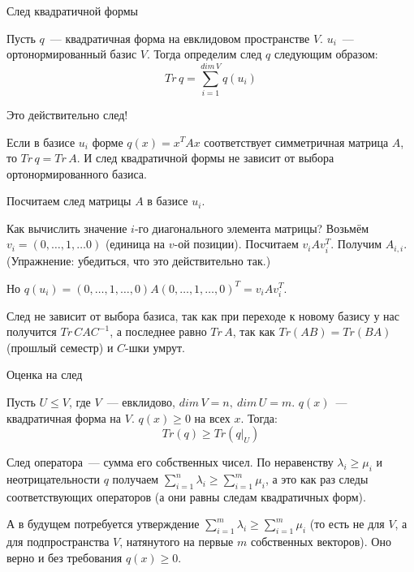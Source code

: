 \dfn След квадратичной формы
\edfn

Пусть $q$~--- квадратичная форма на евклидовом пространстве $V$. $u_i$~--- ортонормированный базис $V$. Тогда определим след $q$ следующим образом:
$$
Tr\,q=\sum\limits_{i=1}^{dim\,V} q(u_i)
$$

\thrm Это действительно след!

Если в базисе $u_i$ форме $q(x)=x^TAx$ соответствует симметричная матрица $A$, то $Tr\,q=Tr\,A$. И след квадратичной формы не зависит от выбора ортонормированного базиса.

\proof

Посчитаем след матрицы $A$ в базисе $u_i$.

Как вычислить значение $i$-го диагонального элемента матрицы? Возьмём $v_i=(0,\ldots,1,\ldots 0)$ (единица на $v$-ой позиции). Посчитаем $v_iAv_i^T$. Получим $A_{i, i}$. (Упражнение: убедиться, что это действительно так.)

Но $q(u_i) = (0,\ldots,1,\ldots,0)A(0,\ldots,1,\ldots,0)^T = v_iAv_i^T$.

След не зависит от выбора базиса, так как при переходе к новому базису у нас получится $Tr\,CAC^{-1}$, а последнее равно $Tr\,A$, так как $Tr(AB)=Tr(BA)$ (прошлый семестр) и $C$-шки умрут.

\endproof
\ethrm

\thrm Оценка на след

Пусть $U\le V$, где $V$~--- евклидово, $dim\,V = n,\ dim\,U = m$. $q(x)$~--- квадратичная форма на $V$. $q(x)\ge 0$ на всех $x$. Тогда:
$$
Tr(q)\ge Tr(q|_U)
$$

\proof

След оператора~--- сумма его собственных чисел. По неравенству $\lambda_i\ge\mu_i$ и неотрицательности $q$ получаем $\sum\limits_{i=1}^n \lambda_i \ge \sum\limits_{i=1}^m \mu_i$, а это как раз следы соответствующих операторов (а они равны следам квадратичных форм).

\rem А в будущем потребуется утверждение $\sum\limits_{i = 1}^m \lambda_i \ge \sum\limits_{i = 1}^m \mu_i$ (то есть не для $V$, а для подпространства $V$, натянутого на первые $m$ собственных векторов). Оно верно и без требования $q(x)\ge 0$.
\endproof
\ethrm

